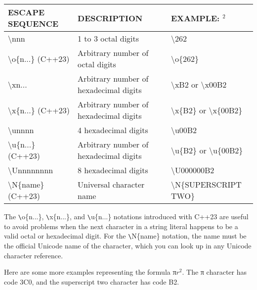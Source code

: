 \begin{longtable}{|l|l|l|}
\hline
\textbf{ESCAPE SEQUENCE}          & \textbf{DESCRIPTION}                   & \textbf{EXAMPLE:  $^2$}                                  \\ \hline
\endfirsthead
%
\endhead
%
\textbackslash{}nnn               & 1 to 3 octal digits                    & \textbackslash{}262                                  \\ \hline
\textbackslash{}o\{n...\} (C++23) & Arbitrary number of octal digits       & \textbackslash{}o\{262\}                             \\ \hline
\textbackslash{}xn...             & Arbitrary number of hexadecimal digits & \textbackslash{}xB2 or \textbackslash{}x00B2         \\ \hline
\textbackslash{}x\{n...\} (C++23) & Arbitrary number of hexadecimal digits & \textbackslash{}x\{B2\} or \textbackslash{}x\{00B2\} \\ \hline
\textbackslash{}unnnn             & 4 hexadecimal digits                   & \textbackslash{}u00B2                                \\ \hline
\textbackslash{}u\{n...\} (C++23) & Arbitrary number of hexadecimal digits & \textbackslash{}u\{B2\} or \textbackslash{}u\{00B2\} \\ \hline
\textbackslash{}Unnnnnnnn         & 8 hexadecimal digits                   & \textbackslash{}U000000B2                            \\ \hline
\textbackslash{}N\{name\} (C++23) & Universal character name               & \textbackslash{}N\{SUPERSCRIPT TWO\}                 \\ \hline
\end{longtable}

The \verb|\|o\{n...\}, \verb|\|x\{n...\}, and \verb|\|u\{n...\} notations introduced with C++23 are useful to avoid problems when the next character in a string literal happens to be a valid octal or hexadecimal digit. For the \verb|\|N\{name\} notation, the name must be the official Unicode name of the character, which you can look up in any Unicode character reference.

Here are some more examples representing the formula π$r^2$. The π character has code 3C0, and the superscript two character has code B2.

